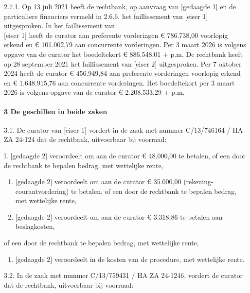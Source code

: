 \documentclass[
  dutch,
  a4paper,
]{article}
\providecommand{\tightlist}{%
  \setlength{\itemsep}{0pt}\setlength{\parskip}{0pt}}
\begin{document}
2.7.1. Op 13 juli 2021 heeft de rechtbank, op aanvraag van {[}gedaagde 1{]} en de particuliere financiers vermeld in 2.6.6, het faillissement van {[}eiser 1{]} uitgesproken. In het faillissement van\\
{[}eiser 1{]} heeft de curator aan preferente vorderingen € 786.738,00 voorlopig erkend en € 101.002,79 aan concurrente vorderingen. Per 3 maart 2026 is volgens opgave van de curator het boedeltekort € 886.548,01 + p.m. De rechtbank heeft op 28 september 2021 het faillissement van {[}eiser 2{]} uitgesproken. Per 7 oktober 2024 heeft de curator € 456.949,84 aan preferente vorderingen voorlopig erkend en € 1.648.915,76 aan concurrente vorderingen. Het boedeltekort per 3 maart 2026 is volgens opgave van de curator € 2.208.533,29 + p.m.

\paragraph{3 De geschillen in beide zaken}\label{de-geschillen-in-beide-zaken}

3.1. De curator van {[}eiser 1{]} vordert in de zaak met nummer C/13/746164 / HA ZA 24-124 dat de rechtbank, uitvoerbaar bij voorraad:

I. {[}gedaagde 2{]} veroordeelt om aan de curator € 48.000,00 te betalen, of een door de rechtbank te bepalen bedrag, met wettelijke rente,

\begin{enumerate}
\def\labelenumi{\Roman{enumi}.}
\setcounter{enumi}{1}
\item
  {[}gedaagde 2{]} veroordeelt om aan de curator € 35.000,00 (rekening-courantvordering) te betalen, of een door de rechtbank te bepalen bedrag, met wettelijke rente,
\item
  {[}gedaagde 2{]} veroordeelt om aan de curator € 3.318,86 te betalen aan beslagkosten,
\end{enumerate}

of een door de rechtbank te bepalen bedrag, met wettelijke rente,

\begin{enumerate}
\def\labelenumi{\Roman{enumi}.}
\setcounter{enumi}{3}
\tightlist
\item
  {[}gedaagde 2{]} veroordeelt in de kosten van de procedure, met wettelijke rente.
\end{enumerate}

3.2. In de zaak met nummer C/13/759431 / HA ZA 24-1246, vordert de curator dat de rechtbank, uitvoerbaar bij voorraad:
\end{document}
